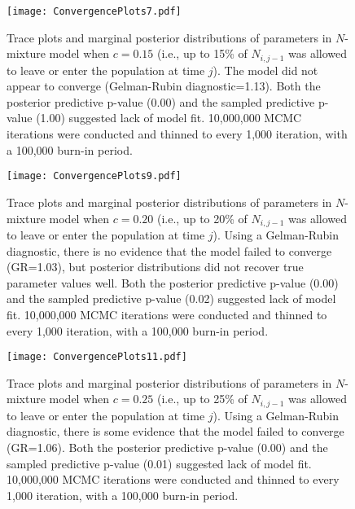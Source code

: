 \documentclass[12pt,letterpaper,final]{article}\usepackage[]{graphicx}\usepackage[]{color}
\begin{document}
\begin{center}
  \begin{figure}[H]
    \texttt{[image: ConvergencePlots7.pdf]}
    \caption[Simulated data: $c=0.15$]{Trace plots and marginal
      posterior distributions of parameters in $N$-mixture model when
      $c=0.15$ (i.e., up to 15\% of $N_{i,j-1}$ was allowed to leave
      or enter the population at time $j$). The model did not appear
      to converge (Gelman-Rubin diagnostic=1.13). Both the posterior
      predictive p-value (0.00) and the sampled predictive p-value
      (1.00) suggested lack of model fit. 10,000,000 MCMC iterations
      were conducted and thinned to every 1,000 iteration, with a
      100,000 burn-in period.}
  \end{figure}
\end{center}

\begin{center}
  \begin{figure}[H]
    \texttt{[image: ConvergencePlots9.pdf]}
    \caption[Simulated data: $c=0.20$]{Trace plots and marginal
      posterior distributions of parameters in $N$-mixture model when
      $c=0.20$ (i.e., up to 20\% of $N_{i,j-1}$ was allowed to leave
      or enter the population at time $j$). Using a Gelman-Rubin
      diagnostic, there is no evidence that the model failed to
      converge (GR=1.03), but posterior distributions did not recover
      true parameter values well. Both the posterior predictive
      p-value (0.00) and the sampled predictive p-value (0.02)
      suggested lack of model fit. 10,000,000 MCMC iterations were
      conducted and thinned to every 1,000 iteration, with a 100,000
      burn-in period.}
  \end{figure}
\end{center}

\begin{center}
  \begin{figure}[H]
    \texttt{[image: ConvergencePlots11.pdf]}
    \caption[Simulated data: $c=0.25$]{Trace plots and marginal
      posterior distributions of parameters in $N$-mixture model when
      $c=0.25$ (i.e., up to 25\% of $N_{i,j-1}$ was allowed to leave
      or enter the population at time $j$). Using a Gelman-Rubin
      diagnostic, there is some evidence that the model failed to
      converge (GR=1.06). Both the posterior predictive p-value (0.00)
      and the sampled predictive p-value (0.01) suggested lack of
      model fit. 10,000,000 MCMC iterations were conducted and thinned
      to every 1,000 iteration, with a 100,000 burn-in period.}
  \end{figure}
\end{center}
\end{document}
